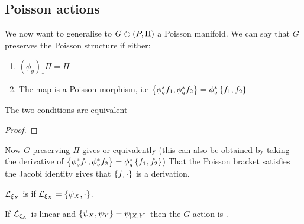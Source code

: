 \documentclass{article}
\begin{document}
\subsection{Poisson actions}

We now want to generalise to $G \lact (P,\Pi)$ a Poisson manifold. We can say that $G$ preserves the Poisson structure if either:
\begin{enumerate}
    \item $(\phi_g)_\ast \Pi = \Pi$
    \item The map 
    is a Poisson morphism, i.e $\acomm[\phi_g^\ast f_1]{\phi_g^\ast f_2} = \phi_g^\ast \acomm[f_1]{f_2}$
\end{enumerate}

\begin{prop}
The two conditions are equivalent
\end{prop}
\begin{proof}
\end{proof}
 Now $G$ preserving $\Pi$ gives 
 or equivalently (this can also be obtained by taking the derivative of $\acomm[\phi_g^\ast f_1]{\phi_g^\ast f_2} = \phi_g^\ast \acomm[f_1]{f_2}$)
 That the Poisson bracket satisfies the Jacobi identity gives that $\acomm[f]{\cdot}$ is a derivation. 
 
 \begin{definition}
 $\mc{L}_{\xi_X}$ is  if $\mc{L}_{\xi_X} = \acomm[\psi_X]{\cdot}$.
 \end{definition}

\begin{definition}
If $\mc{L}_{\xi_X}$ is linear and $\acomm[\psi_X]{\psi_Y} = \psi_{\comm[X]{Y}}$ then the $G$ action is .
\end{definition}
\end{document}
